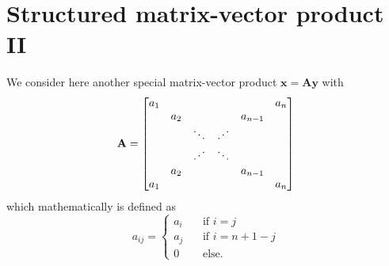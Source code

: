 \documentclass{article}
\begin{document}
\section*{Structured matrix-vector product II}
We consider here another special matrix-vector product $\mathbf{x} = \mathbf{A}\mathbf{y}$ with 
\begin{equation*}
    \mathbf{A} = 
    \begin{bmatrix}
    a_{1} & &&& & a_{n} \\
     & a_{2} &&&  a_{n-1} &\\
     & &\ddots  &\text{\reflectbox{$\ddots$}}& & \\
     &&\text{\reflectbox{$\ddots$}} & \ddots& &  \\
     & a_{2} &&&  a_{n-1} &\\
     a_{1} &&&&& a_{n}
    \end{bmatrix}
\end{equation*}
which mathematically is defined as 
\begin{equation*}
    a_{ij} = 
    \begin{cases}
    a_{i} \quad &\text{if } i = j \\
    a_{j} &\text{if } i = n + 1 - j \\
    0 &\text{else.}
    \end{cases}
\end{equation*}
\end{document}
